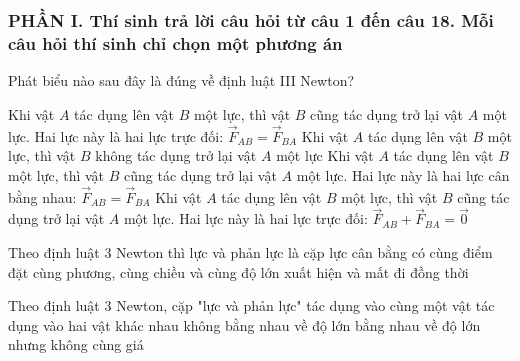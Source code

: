 \subsubsection*{PHẦN I. Thí sinh trả lời câu hỏi từ câu 1 đến câu 18. Mỗi câu hỏi thí sinh chỉ chọn một phương án}
\setcounter{ex}{0}
\begin{ex}%
Phát biểu nào sau đây là đúng về định luật III Newton?

\choice
{Khi vật $A$ tác dụng lên vật $B$ một lực, thì vật $B$ cũng tác dụng trở lại vật $A$ một lực. Hai lực này là hai lực trực đối: $\vec{F}_{AB}=\vec{F}_{BA}$}
{Khi vật $A$ tác dụng lên vật $B$ một lực, thì vật $B$ không tác dụng trở lại vật $A$ một lực}
{Khi vật $A$ tác dụng lên vật $B$ một lực, thì vật $B$ cũng tác dụng trở lại vật $A$ một lực. Hai lực này là hai lực cân bằng nhau: $\vec{F}_{AB}=\vec{F}_{BA}$}
{\True Khi vật $A$ tác dụng lên vật $B$ một lực, thì vật $B$ cũng tác dụng trở lại vật $A$ một lực. Hai lực này là hai lực trực đối: $\vec{F}_{AB}+\vec{F}_{BA}=\vec 0$}
 \end{ex}
\begin{ex}%
Theo định luật 3 Newton thì lực và phản lực là cặp lực
\choice
{cân bằng}
{có cùng điểm đặt}
{cùng phương, cùng chiều và cùng độ lớn}
{\True xuất hiện và mất đi đồng thời}
 \end{ex}
\begin{ex}%
Theo định luật $3$ Newton, cặp "lực và phản lực"
\choice
{tác dụng vào cùng một vật}
{\True tác dụng vào hai vật khác nhau}
{không bằng nhau về độ lớn}
{bằng nhau về độ lớn nhưng không cùng giá}
 \end{ex}

